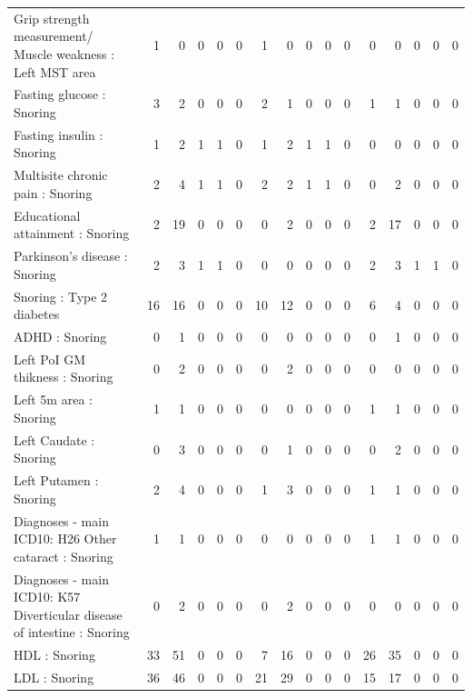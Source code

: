 \begin{table}[ht]
\begin{tabular}{lrrrrrrrrrrrrrrr}
  Grip strength measurement/ Muscle weakness : Left MST area &   1 &   0 &   0 &   0 &   0 &   1 &   0 &   0 &   0 &   0 &   0 &   0 &   0 &   0 &   0 \\ 
  Fasting glucose : Snoring &   3 &   2 &   0 &   0 &   0 &   2 &   1 &   0 &   0 &   0 &   1 &   1 &   0 &   0 &   0 \\ 
  Fasting insulin : Snoring &   1 &   2 &   1 &   1 &   0 &   1 &   2 &   1 &   1 &   0 &   0 &   0 &   0 &   0 &   0 \\ 
  Multisite chronic pain : Snoring &   2 &   4 &   1 &   1 &   0 &   2 &   2 &   1 &   1 &   0 &   0 &   2 &   0 &   0 &   0 \\ 
  Educational attainment : Snoring &   2 &  19 &   0 &   0 &   0 &   0 &   2 &   0 &   0 &   0 &   2 &  17 &   0 &   0 &   0 \\ 
  Parkinson's disease : Snoring &   2 &   3 &   1 &   1 &   0 &   0 &   0 &   0 &   0 &   0 &   2 &   3 &   1 &   1 &   0 \\ 
  Snoring : Type 2 diabetes &  16 &  16 &   0 &   0 &   0 &  10 &  12 &   0 &   0 &   0 &   6 &   4 &   0 &   0 &   0 \\ 
  ADHD : Snoring &   0 &   1 &   0 &   0 &   0 &   0 &   0 &   0 &   0 &   0 &   0 &   1 &   0 &   0 &   0 \\ 
  Left PoI GM thikness : Snoring &   0 &   2 &   0 &   0 &   0 &   0 &   2 &   0 &   0 &   0 &   0 &   0 &   0 &   0 &   0 \\ 
  Left 5m area : Snoring &   1 &   1 &   0 &   0 &   0 &   0 &   0 &   0 &   0 &   0 &   1 &   1 &   0 &   0 &   0 \\ 
  Left Caudate : Snoring &   0 &   3 &   0 &   0 &   0 &   0 &   1 &   0 &   0 &   0 &   0 &   2 &   0 &   0 &   0 \\ 
  Left Putamen : Snoring &   2 &   4 &   0 &   0 &   0 &   1 &   3 &   0 &   0 &   0 &   1 &   1 &   0 &   0 &   0 \\ 
  Diagnoses - main ICD10: H26 Other cataract : Snoring &   1 &   1 &   0 &   0 &   0 &   0 &   0 &   0 &   0 &   0 &   1 &   1 &   0 &   0 &   0 \\ 
  Diagnoses - main ICD10: K57 Diverticular disease of intestine : Snoring &   0 &   2 &   0 &   0 &   0 &   0 &   2 &   0 &   0 &   0 &   0 &   0 &   0 &   0 &   0 \\ 
  HDL : Snoring &  33 &  51 &   0 &   0 &   0 &   7 &  16 &   0 &   0 &   0 &  26 &  35 &   0 &   0 &   0 \\ 
  LDL : Snoring &  36 &  46 &   0 &   0 &   0 &  21 &  29 &   0 &   0 &   0 &  15 &  17 &   0 &   0 &   0 \\ 

\end{tabular}
\end{table}
